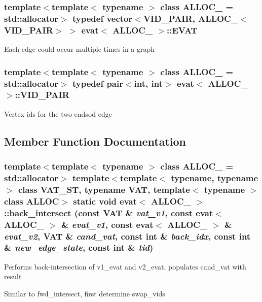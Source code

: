 \subsubsection{\setlength{\rightskip}{0pt plus 5cm}template$<$template$<$ typename $>$ class ALLOC\_\- = std::allocator$>$ typedef vector$<$\bf{VID\_\-PAIR}, ALLOC\_\-$<$\bf{VID\_\-PAIR}$>$ $>$ \bf{evat}$<$ ALLOC\_\- $>$::\bf{EVAT}}\label{classevat_38c8ee4ef89ea8e9476013cabc7e217e}


Each edge could occur multiple times in a graph 
\subsubsection{\setlength{\rightskip}{0pt plus 5cm}template$<$template$<$ typename $>$ class ALLOC\_\- = std::allocator$>$ typedef pair$<$int, int$>$ \bf{evat}$<$ ALLOC\_\- $>$::\bf{VID\_\-PAIR}}\label{classevat_102a222aa84b7ae324271ffab7e27022}


Vertex ids for the two endsod edge 

\subsection{Member Function Documentation}
\subsubsection{\setlength{\rightskip}{0pt plus 5cm}template$<$template$<$ typename $>$ class ALLOC\_\- = std::allocator$>$ template$<$template$<$ typename, typename $>$ class VAT\_\-ST, typename VAT, template$<$ typename $>$ class ALLOC$>$ static void \bf{evat}$<$ ALLOC\_\- $>$::back\_\-intersect (const VAT \& {\em vat\_\-v1}, const \bf{evat}$<$ ALLOC\_\- $>$ \& {\em evat\_\-v1}, const \bf{evat}$<$ ALLOC\_\- $>$ \& {\em evat\_\-v2}, VAT \& {\em cand\_\-vat}, const int \& {\em back\_\-idx}, const int \& {\em new\_\-edge\_\-state}, const int \& {\em tid})\hspace{0.3cm}{\tt  [inline, static]}}\label{classevat_a1fea2d152697ef4dafab9bb9679a1cc}


Performs back-intersection of v1\_\-evat and v2\_\-evat; populates cand\_\-vat with result 

Similar to fwd\_\-intersect, first determine swap\_\-vids 
